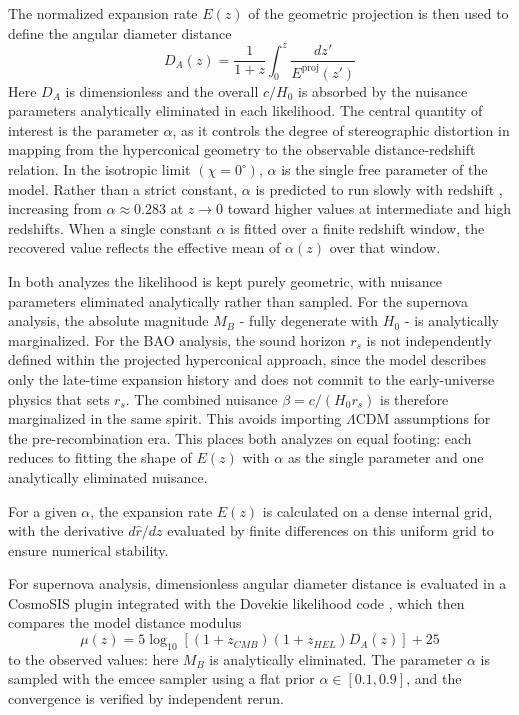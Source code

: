\documentclass[3p,times,twocolumn]{elsarticle}
\begin{document}
The normalized expansion rate $E(z)$ of the geometric projection is then used to define the angular diameter distance
\begin{equation}
    D_A(z) = \frac{1}{1 + z} \int_{0}^{z} \frac{dz'}{E^{\mathrm{proj}}(z')}
\end{equation}
Here $D_A$ is dimensionless and the overall $c/H_0$ is absorbed by the nuisance parameters analytically eliminated in each likelihood. The central quantity of interest is the parameter $\alpha$, as it controls the degree of stereographic distortion in mapping from the hyperconical geometry to the observable distance-redshift relation. In the isotropic limit $(\chi = 0^\circ)$, $\alpha$ is the single free parameter of the model. Rather than a strict constant, $\alpha$ is predicted to run slowly with redshift \cite{monjo2018projected}, increasing from $\alpha \approx 0.283$ at $z \rightarrow 0$ toward higher values at intermediate and high redshifts. When a single constant $\alpha$ is fitted over a finite redshift window, the recovered value reflects the effective mean of $\alpha(z)$ over that window.

In both analyzes the likelihood is kept purely geometric, with nuisance parameters eliminated analytically rather than sampled. For the supernova analysis, the absolute magnitude $M_B$ - fully degenerate with $H_0$ - is analytically marginalized. For the BAO analysis, the sound horizon $r_s$ is not independently defined within the projected hyperconical approach, since the model describes only the late-time expansion history and does not commit to the early-universe physics that sets $r_s$. The combined nuisance $\beta = c/(H_0r_s)$ is therefore marginalized in the same spirit. This avoids importing $\Lambda$CDM assumptions for the pre-recombination era. This places both analyzes on equal footing: each reduces to fitting the shape of $E(z)$ with $\alpha$ as the single parameter and one analytically eliminated nuisance.

For a given $\alpha$, the expansion rate $E(z)$ is calculated on a dense internal grid, with the derivative $d\hat{r}/dz$ evaluated by finite differences on this uniform grid to ensure numerical stability.

For supernova analysis, dimensionless angular diameter distance is evaluated in a CosmoSIS plugin integrated with the Dovekie likelihood code \cite{popovic2026dark}, which then compares the model distance modulus
\begin{equation}
    \mu(z) = 5\log_{10}[(1 + z_{CMB})(1 + z_{HEL})D_A(z)] + 25
\end{equation}
to the observed values: here $M_B$ is analytically eliminated. The parameter $\alpha$ is sampled with the emcee sampler using a flat prior $\alpha \in [0.1,0.9]$, and the convergence is verified by independent rerun.
\end{document}
